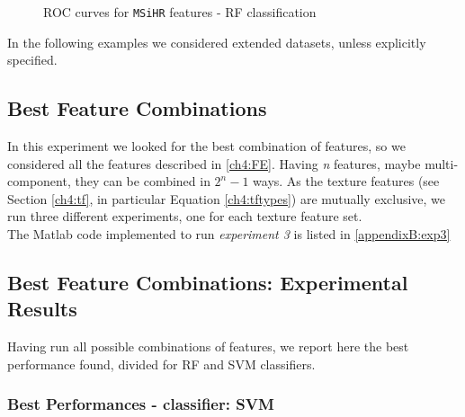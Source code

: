 \begin{figure}[!htb]
    \caption{ROC curves for \texttt{MSiHR} features - RF classification}
    \label{ch6:fig5}
\end{figure}


In the following examples we considered extended datasets, unless explicitly specified.


\vspace{0.5cm}

\subsection{Best Feature Combinations}
\label{ch6:sec_best}

In this experiment we looked for the best combination of features, so we considered all the features described in \ref{ch4:FE}. Having \textit{n} features, maybe multi-component,
they can be combined in $2^n-1$ ways. As the texture features (see Section \ref{ch4:tf}, in particular Equation \ref{ch4:tftypes}) are mutually exclusive, we run three different
experiments, one for each texture feature set.
\\
The Matlab code implemented to run \textit{experiment 3} is listed in \ref{appendixB:exp3}

\vspace{0.5cm}


\subsection{Best Feature Combinations: Experimental Results}


Having run all possible combinations of features, we report here the best performance found, divided for \Gls{RF} and \Gls{SVM} classifiers.

\vspace{0.5cm}

\subsubsection{Best Performances - classifier: SVM}


